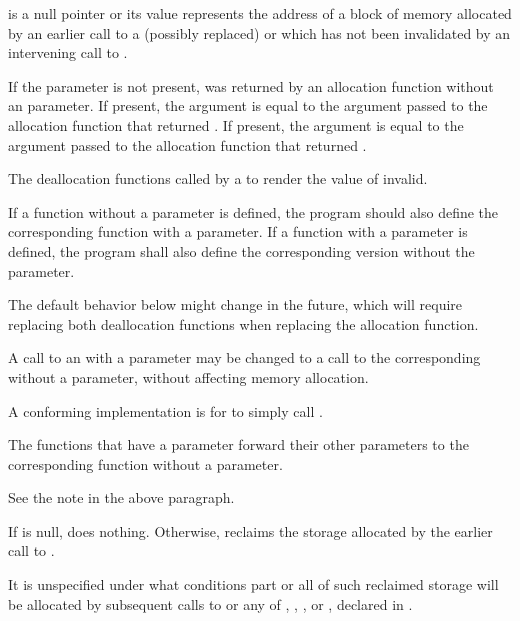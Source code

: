 \begin{itemdescr}
\pnum
\expects
{} is a null pointer or
its value represents the address of
a block of memory allocated by
an earlier call to a (possibly replaced)
or
which has not been invalidated by an intervening call to
.

\pnum
If the  parameter is not present,
 was returned by an allocation function
without an  parameter.
If present, the  argument
is equal to the  argument
passed to the allocation function that returned .
If present, the  argument
is equal to the  argument
passed to the allocation function that returned .

\pnum
\effects
The
deallocation functions
called by a
to render the value of  invalid.

\pnum
\replaceable
{}
If a function without a  parameter is defined,
the program should also define
the corresponding function with a  parameter.
If a function with a  parameter is defined,
the program shall also define
the corresponding version without the  parameter.
\begin{note}
The default behavior below might change in the future, which will require
replacing both deallocation functions when replacing the allocation function.
\end{note}

\pnum
\required
A call to an 
with a  parameter
may be changed to
a call to the corresponding 
without a  parameter,
without affecting memory allocation.
\begin{note}
A conforming implementation is for
 to simply call
.
\end{note}

\pnum
{}
The functions that have a  parameter
forward their other parameters
to the corresponding function without a  parameter.
\begin{note}
See the note in the above \replaceable paragraph.
\end{note}

\pnum
{}
If  is null, does nothing. Otherwise, reclaims the
storage allocated by the earlier call to .

\pnum
\remarks
It is unspecified under what conditions part or all of such
%
reclaimed storage will be allocated by subsequent
calls to
or any of
,
,
,
or
,
declared in .
\end{itemdescr}

